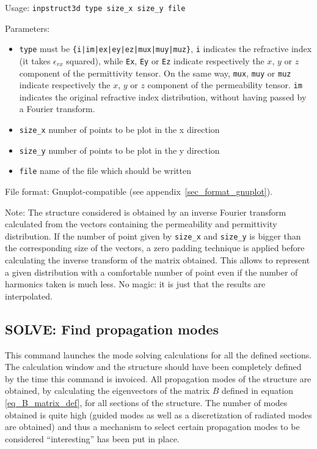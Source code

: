     Usage: \lstinline!inpstruct3d type size_x size_y file!
    
    
    Parameters:
    \begin{itemize}
    \item
    \lstinline!type!    must be \lstinline!{i|im|ex|ey|ez|mux|muy|muz}!, \lstinline!i! indicates the 
            refractive index
            (it takes $\epsilon_{rx}$ squared), while \lstinline!Ex!, \lstinline!Ey! or \lstinline!Ez! indicate respectively the
            $x$, $y$ or $z$ component of the permittivity tensor. On the same way,
            \lstinline!mux!, \lstinline!muy! or \lstinline!muz! indicate respectively the $x$, $y$ or $z$ component of the 
            permeability tensor. \lstinline!im! indicates the original refractive index distribution, without having passed by a Fourier transform.
    \item
    \lstinline!size_x!  number of points to be plot in the x direction
    \item
    \lstinline!size_y!  number of points to be plot in the y direction
    \item
    \lstinline!file!    name of the file which should be written
    \end{itemize}
    
File format: Gnuplot-compatible (see appendix~\ref{sec_format_gnuplot}).

Note: The structure considered is obtained by an inverse Fourier transform 
calculated from the vectors containing the permeability and permittivity
distribution. If the number of point given by \lstinline!size_x! and \lstinline!size_y! is bigger than 
the corresponding size of the vectors, a zero padding technique is applied 
before calculating the inverse transform of the matrix obtained. This allows to
represent a given distribution with a comfortable number of point even if the
number of harmonics taken is much less. No magic: it is just that the results
are interpolated.

\subsection{SOLVE: Find propagation modes}
\label{subsec_solve}
This command launches the mode solving calculations for all the defined sections. The calculation window and the structure should have been completely defined by the time this command is invoiced. All propagation modes of the structure are obtained, by calculating the eigenvectors of the matrix $B$ defined in equation \eqref{eq_B_matrix_def}, for all sections of the structure. The number of modes obtained is quite high (guided modes as well as a discretization of radiated modes are obtained) and thus a mechanism to select certain propagation modes to be considered ``interesting'' has been put in place.

